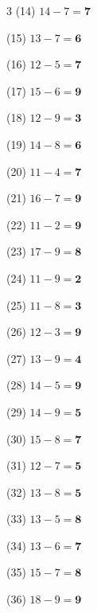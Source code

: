 \documentclass[a4paper, 11pt]{ltjsarticle}
\begin{document}
\begin{multicols*}{3}
\noindent (14) \quad $14 - 7 = \mathbf{7}$
\vspace*{\fill}

\noindent (15) \quad $13 - 7 = \mathbf{6}$
\vspace*{\fill}

\noindent (16) \quad $12 - 5 = \mathbf{7}$
\vspace*{\fill}

\noindent (17) \quad $15 - 6 = \mathbf{9}$
\vspace*{\fill}

\noindent (18) \quad $12 - 9 = \mathbf{3}$
\vspace*{\fill}

\noindent (19) \quad $14 - 8 = \mathbf{6}$
\vspace*{\fill}

\noindent (20) \quad $11 - 4 = \mathbf{7}$
\vspace*{\fill}

\noindent (21) \quad $16 - 7 = \mathbf{9}$
\vspace*{\fill}

\noindent (22) \quad $11 - 2 = \mathbf{9}$
\vspace*{\fill}

\noindent (23) \quad $17 - 9 = \mathbf{8}$
\vspace*{\fill}

\noindent (24) \quad $11 - 9 = \mathbf{2}$
\vspace*{\fill}
\columnbreak

\noindent (25) \quad $11 - 8 = \mathbf{3}$
\vspace*{\fill}

\noindent (26) \quad $12 - 3 = \mathbf{9}$
\vspace*{\fill}

\noindent (27) \quad $13 - 9 = \mathbf{4}$
\vspace*{\fill}

\noindent (28) \quad $14 - 5 = \mathbf{9}$
\vspace*{\fill}

\noindent (29) \quad $14 - 9 = \mathbf{5}$
\vspace*{\fill}

\noindent (30) \quad $15 - 8 = \mathbf{7}$
\vspace*{\fill}

\noindent (31) \quad $12 - 7 = \mathbf{5}$
\vspace*{\fill}

\noindent (32) \quad $13 - 8 = \mathbf{5}$
\vspace*{\fill}

\noindent (33) \quad $13 - 5 = \mathbf{8}$
\vspace*{\fill}

\noindent (34) \quad $13 - 6 = \mathbf{7}$
\vspace*{\fill}

\noindent (35) \quad $15 - 7 = \mathbf{8}$
\vspace*{\fill}

\noindent (36) \quad $18 - 9 = \mathbf{9}$
\vspace*{\fill}

\end{multicols*}
\end{document}
